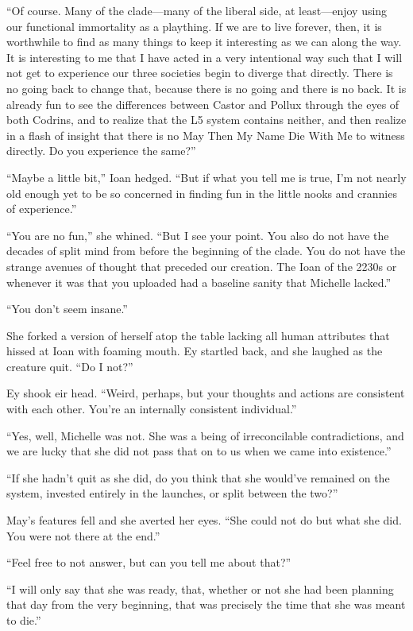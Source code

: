 ``Of course. Many of the clade---many of the liberal side, at least---enjoy using our functional immortality as a plaything. If we are to live forever, then, it is worthwhile to find as many things to keep it interesting as we can along the way. It is interesting to me that I have acted in a very intentional way such that I will not get to experience our three societies begin to diverge that directly. There is no going back to change that, because there is no going and there is no back. It is already fun to see the differences between Castor and Pollux through the eyes of both Codrins, and to realize that the L5 system contains neither, and then realize in a flash of insight that there is no May Then My Name Die With Me to witness directly. Do you experience the same?''

``Maybe a little bit,'' Ioan hedged. ``But if what you tell me is true, I'm not nearly old enough yet to be so concerned in finding fun in the little nooks and crannies of experience.''

``You are no fun,'' she whined. ``But I see your point. You also do not have the decades of split mind from before the beginning of the clade. You do not have the strange avenues of thought that preceded our creation. The Ioan of the 2230s or whenever it was that you uploaded had a baseline sanity that Michelle lacked.''

``You don't seem insane.''

She forked a version of herself atop the table lacking all human attributes that hissed at Ioan with foaming mouth. Ey startled back, and she laughed as the creature quit. ``Do I not?''

Ey shook eir head. ``Weird, perhaps, but your thoughts and actions are consistent with each other. You're an internally consistent individual.''

``Yes, well, Michelle was not. She was a being of irreconcilable contradictions, and we are lucky that she did not pass that on to us when we came into existence.''

``If she hadn't quit as she did, do you think that she would've remained on the system, invested entirely in the launches, or split between the two?''

May's features fell and she averted her eyes. ``She could not do but what she did. You were not there at the end.''

``Feel free to not answer, but can you tell me about that?''

``I will only say that she was ready, that, whether or not she had been planning that day from the very beginning, that was precisely the time that she was meant to die.''

